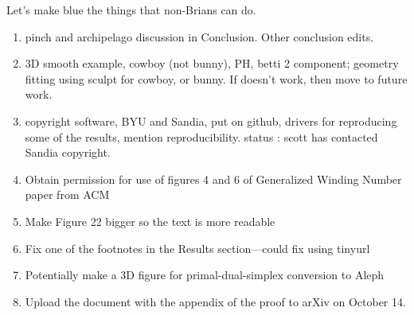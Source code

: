 {\Rd
Let's {\KS make blue} the things that non-Brians can do.
\begin{enumerate}
\item {\KS pinch and archipelago discussion in Conclusion. Other conclusion edits.}
\item 3D smooth example, cowboy (not bunny), PH, betti 2 component; geometry fitting using sculpt for cowboy, or bunny. If doesn't work, then move to future work.
\item copyright software, BYU and Sandia, put on github, drivers for reproducing some of the results, mention reproducibility. status : scott has contacted Sandia copyright.
\item Obtain permission for use of figures 4 and 6 of Generalized Winding Number paper from ACM
\item Make Figure 22 bigger so the text is more readable
\item Fix one of the footnotes in the Results section---could fix using tinyurl
\item Potentially make a 3D figure for primal-dual-simplex conversion to Aleph
\item Upload the document with the appendix of the proof to arXiv on October 14.
\end{enumerate}
}

